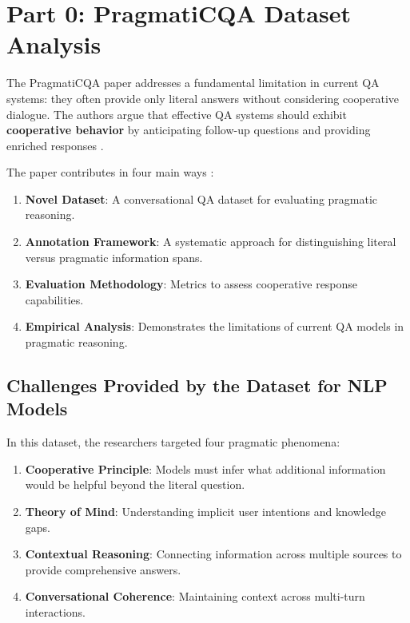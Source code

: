 \documentclass[12pt, letterpaper]{article}
\begin{document}


\newpage
\tableofcontents
\newpage
\listoftables
\listoffigures
\newpage



\section*{Part 0: PragmatiCQA Dataset Analysis}
\label{intro}
{}
The PragmatiCQA paper addresses a fundamental limitation in current QA systems: they often provide only literal answers without considering cooperative dialogue. The authors argue that effective QA systems should exhibit \textbf{cooperative behavior} by anticipating follow-up questions and providing enriched responses \citep{pragmaticqa2023}. 

The paper contributes in four main ways \citep{pragmaticqa2023}:
\begin{enumerate}
    \item \textbf{Novel Dataset}: A conversational QA dataset for evaluating pragmatic reasoning.
    \item \textbf{Annotation Framework}: A systematic approach for distinguishing literal versus pragmatic information spans.
    \item \textbf{Evaluation Methodology}: Metrics to assess cooperative response capabilities.
    \item \textbf{Empirical Analysis}: Demonstrates the limitations of current QA models in pragmatic reasoning.
\end{enumerate}

\subsection*{Challenges Provided by the Dataset for NLP Models}
In this dataset, the researchers targeted four pragmatic phenomena:
\begin{enumerate}
    \item \textbf{Cooperative Principle}: Models must infer what additional information would be helpful beyond the literal question.
    \item \textbf{Theory of Mind}: Understanding implicit user intentions and knowledge gaps.
    \item \textbf{Contextual Reasoning}: Connecting information across multiple sources to provide comprehensive answers.
    \item \textbf{Conversational Coherence}: Maintaining context across multi-turn interactions.
\end{enumerate}
\end{document}
